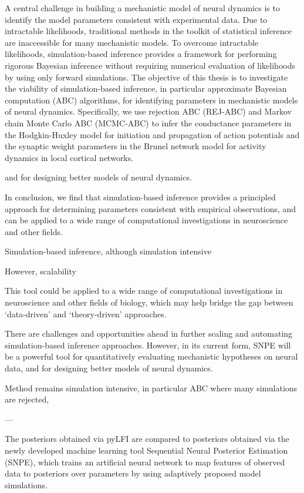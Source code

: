 A central challenge in building a mechanistic model of neural dynamics is to identify the model parameters consistent with experimental data. Due to intractable likelihoods, traditional methods in the toolkit of statistical inference are inaccessible for many mechanistic models. To overcome intractable likelihoods, simulation-based inference provides a framework for performing rigorous Bayesian inference without requiring numerical evaluation of likelihoods by using only forward simulations. The objective of this thesis is to investigate the viability of simulation-based inference, in particular approximate Bayesian computation (ABC) algorithms, for identifying parameters in mechanistic models of neural dynamics. Specifically, we use rejection ABC (REJ-ABC) and Markov chain Monte Carlo ABC (MCMC-ABC) to infer the conductance parameters in the Hodgkin-Huxley model for initiation and propagation of action potentials and the synaptic weight parameters in the Brunel network model for activity dynamics in local cortical networks. 

and for designing better models of neural dynamics.

In conclusion, we find that simulation-based inference provides a principled approach for determining parameters consistent with empirical observations, and can be applied to a wide range of computational investigations in neuroscience and other fields. 

Simulation-based inference, although simulation intensive

However, scalability

This tool could be applied to a wide range of computational investigations in neuroscience and other fields of biology, which may help bridge the gap between ‘data-driven’ and ‘theory-driven’ approaches.

There are challenges and opportunities ahead in further scaling and automating simulation-based inference approaches. However, in its current form, SNPE will be a powerful tool for quantitatively evaluating mechanistic hypotheses on neural data, and for designing better models of neural dynamics.

Method remains simulation intensive, in particular ABC where many simulations are rejected, 


---

The posteriors obtained via pyLFI are compared to posteriors obtained via the newly developed machine learning tool Sequential Neural Posterior Estimation (SNPE), which trains an artificial neural network to map features of observed data to posteriors over parameters by using adaptively proposed model simulations. 



